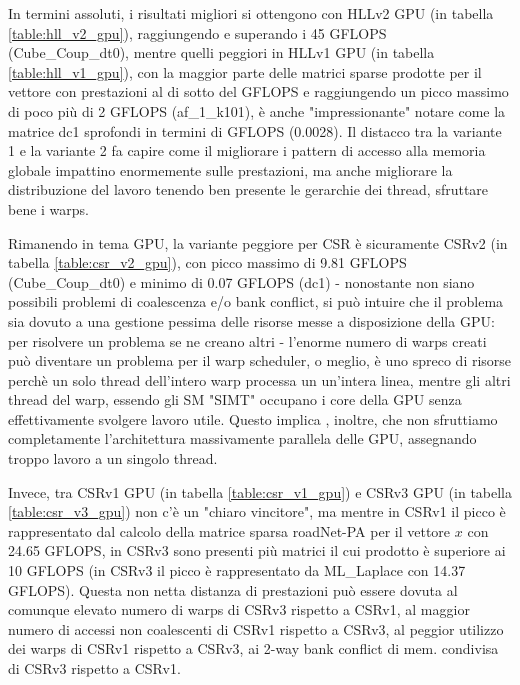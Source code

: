 \documentclass[a4paper,9pt]{extarticle}
\begin{document}
In termini assoluti, i risultati migliori si ottengono con HLLv2 GPU (in tabella 
\ref{table:hll_v2_gpu}), raggiungendo e superando i 45 GFLOPS (Cube\_Coup\_dt0), mentre quelli 
peggiori in HLLv1 GPU (in tabella \ref{table:hll_v1_gpu}), con la maggior parte delle matrici 
sparse prodotte per il
vettore con prestazioni al di sotto del GFLOPS e raggiungendo un picco massimo di poco più di 
2 GFLOPS (af\_1\_k101), è anche "impressionante" notare come la matrice dc1 sprofondi in termini
di GFLOPS (0.0028). Il distacco tra la variante 1 e la variante 2 fa capire come il migliorare
i pattern di accesso alla memoria globale impattino enormemente sulle prestazioni, ma anche
migliorare la distribuzione del lavoro tenendo ben presente le gerarchie dei thread, sfruttare
bene i warps.

Rimanendo in tema GPU, la variante peggiore per CSR è sicuramente CSRv2 (in tabella \ref{table:csr_v2_gpu}), con picco massimo di 9.81 GFLOPS (Cube\_Coup\_dt0) e minimo di
0.07 GFLOPS (dc1) - nonostante non siano possibili problemi di coalescenza e/o bank conflict,
si può intuire che il problema sia dovuto a una gestione pessima delle risorse messe a disposizione
della GPU: per risolvere un problema se ne creano altri - l'enorme numero di warps creati può 
diventare un problema per il warp scheduler, o meglio, è uno spreco di risorse perchè un solo
thread dell'intero warp processa un un'intera linea, mentre gli altri thread del warp, essendo
gli SM "SIMT" occupano i core della GPU senza effettivamente svolgere lavoro utile. Questo implica
, inoltre, che non sfruttiamo completamente l'architettura massivamente parallela delle GPU,
assegnando troppo lavoro a un singolo thread.

Invece, tra CSRv1 GPU (in tabella \ref{table:csr_v1_gpu}) e CSRv3 GPU (in tabella \ref{table:csr_v3_gpu}) non c'è un "chiaro vincitore", ma mentre in CSRv1 il picco è rappresentato
dal calcolo della matrice sparsa roadNet-PA per il vettore $x$ con 24.65 GFLOPS, in CSRv3 sono
presenti più matrici il cui prodotto è superiore ai 10 GFLOPS (in CSRv3 il picco è
rappresentato da ML\_Laplace con 14.37 GFLOPS). Questa non netta distanza di prestazioni 
può essere dovuta al comunque elevato numero di warps di CSRv3 rispetto a CSRv1, al maggior
numero di accessi non coalescenti di CSRv1 rispetto a CSRv3, al peggior utilizzo dei warps
di CSRv1 rispetto a CSRv3, ai 2-way bank conflict di mem. condivisa di CSRv3 rispetto a CSRv1.
\end{document}
